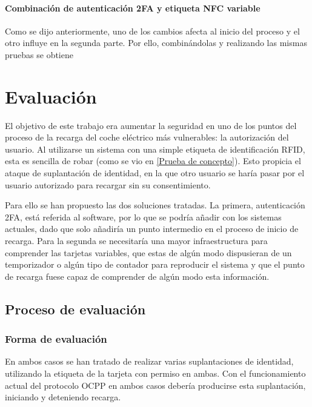 \documentclass[12pt,a4paper,onecolumn,oneside]{report}
\begin{document}
\subsubsection{Combinación de autenticación 2FA y etiqueta NFC variable}

Como se dijo anteriormente, uno de los cambios afecta al inicio del proceso y el otro influye en la segunda parte. Por ello, combinándolas y realizando las mismas pruebas se obtiene



\chapter{Evaluación}
\label{Evaluación}

El objetivo de este trabajo era aumentar la seguridad en uno de los puntos del proceso de la recarga del coche eléctrico más vulnerables: la autorización del usuario. Al utilizarse un sistema con una simple etiqueta de identificación RFID, esta es sencilla de robar (como se vio en \ref{Prueba de concepto}). Esto propicia el ataque de suplantación de identidad, en la que otro usuario se haría pasar por el usuario autorizado para recargar sin su consentimiento.

Para ello se han propuesto las dos soluciones tratadas. La primera, autenticación 2FA, está referida al software, por lo que se podría añadir con los sistemas actuales, dado que solo añadiría un punto intermedio en el proceso de inicio de recarga. Para la segunda se necesitaría una mayor infraestructura para comprender las tarjetas variables,  que estas de algún modo dispusieran de un temporizador o algún tipo de contador para reproducir el sistema y que el punto de recarga fuese capaz de comprender de algún modo esta información.

\section{Proceso de evaluación}

\subsection{Forma de evaluación}

En ambos casos se han tratado de realizar varias suplantaciones de identidad, utilizando la etiqueta de la tarjeta con permiso en ambas. Con el funcionamiento actual del protocolo OCPP en ambos casos debería producirse esta suplantación, iniciando y deteniendo recarga.
\end{document}
